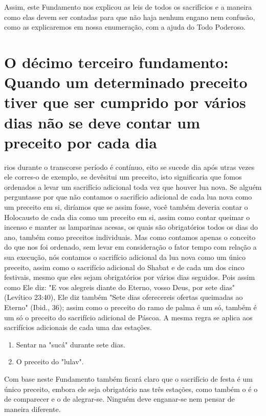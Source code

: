 \begin{itemize}
\begin{enumrate}
\begin{itemize}
Assim, este Fundamento nos explicou as leis de todos os sacrifícios e a
maneira como elas devem ser contadas para que não haja nenhum engano nem
confusão, como as explicaremos em nossa enumeração, com a ajuda do Todo
Poderoso.

\chapter{O décimo terceiro fundamento: Quando um determinado preceito tiver que ser cumprido por vários dias não se deve contar um preceito por cada dia}

rios durante o transcor­se período é contínuo, eito se sucede dia após
utras vezes ele corres-o de exemplo, se devês­itui um preceito, isto
sig­nificaria que fomos ordenados a levar um sacrifício adicional toda
vez que hou­ver lua nova. Se alguém perguntasse por que não contamos o
sacrifício adicional de cada lua nova como um preceito em si, diríamos
que se assim fosse, você tam­bém deveria contar o Holocausto de cada dia
como um preceito em si, assim como contar queimar o incenso e manter as
lamparinas acesas, os quais são obri­gatórios todos os dias do ano,
também como preceitos individuais. Mas como contamos apenas o conceito
do que nos foi ordenado, sem levar em considera­ção o fator tempo com
relação a sua execução, nós contamos o sacrifício adicio­nal da lua nova
como um único preceito, assim como o sacrifício adicional do Shabat e de
cada um dos cinco festivais, mesmo que eles sejam obrigatórios por
vários dias seguidos. Pois assim como Ele diz: "E vos alegreis diante do
Eterno, vosso Deus, por sete dias" (Levítico 23:40), Ele diz também
"Sete dias oferece­reis ofertas queimadas ao Eterno" (Ibid., 36); assim
como o preceito do ramo de palma é um só, também é um só o preceito do
sacrifício adicional de Páscoa. A mesma regra se aplica aos sacrifícios
adicionais de cada uma das estações.


\begin{enumerate}
\def\labelenumi{\arabic{enumi}.}
\setcounter{enumi}{22}
\item
 
 Sentar na "sucá" durante sete dias.
 
\item
 
 O preceito do "lulav".
 
\end{enumerate}



Com base neste Fundamento também ficará claro que o sacrifício de festa
é um único preceito, embora ele seja obrigatório nas três estações,
co­mo também o é o de comparecer e o de alegrar-se. Ninguém deve
enganar-se nem pensar de maneira diferente.


\end{itemize}
\end{enumrate}
\end{itemize}

